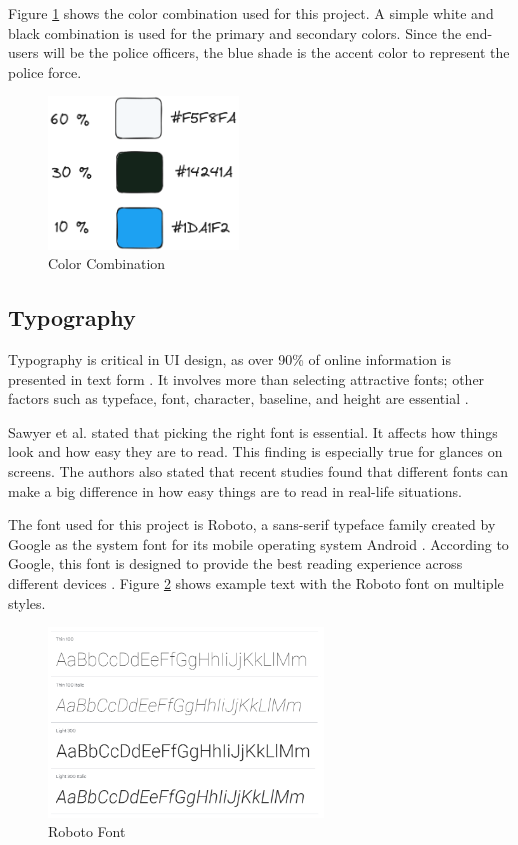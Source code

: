Figure \ref{fig:color-combination} shows the color combination used for this project. A simple white and black combination is used for the primary and secondary colors. Since the end-users will be the police officers, the blue shade is the accent color to represent the police force.

\begin{figure}[!ht]
    \centering
    \includegraphics[width=0.45\textwidth]{texs/Part2/chapter3/image/colorcombination.png}
    \caption{Color Combination}
    \label{fig:color-combination}
\end{figure}

\subsection{Typography}Typography is critical in UI design, as over 90\% of online information is presented in text form \cite{Fitz-Patrick_2022}. It involves more than selecting attractive fonts; other factors such as typeface, font, character, baseline, and height are essential \cite{Fitz-Patrick_2022}.

Sawyer et al. \cite{Sawyer2020} stated that picking the right font is essential. It affects how things look and how easy they are to read. This finding is especially true for glances on screens. The authors also stated that recent studies found that different fonts can make a big difference in how easy things are to read in real-life situations.

The font used for this project is Roboto, a sans-serif typeface family created by Google as the system font for its mobile operating system Android \cite{Mott_2022}. According to Google, this font is designed to provide the best reading experience across different devices \cite{Mott_2022}. Figure \ref{fig:roboto} shows example text with the Roboto font on multiple styles.

\begin{figure}[!ht]
    \centering
    \includegraphics[width=0.65\textwidth]{texs/Part2/chapter3/image/roboto.png}
    \caption{Roboto Font}
    \label{fig:roboto}
\end{figure}

